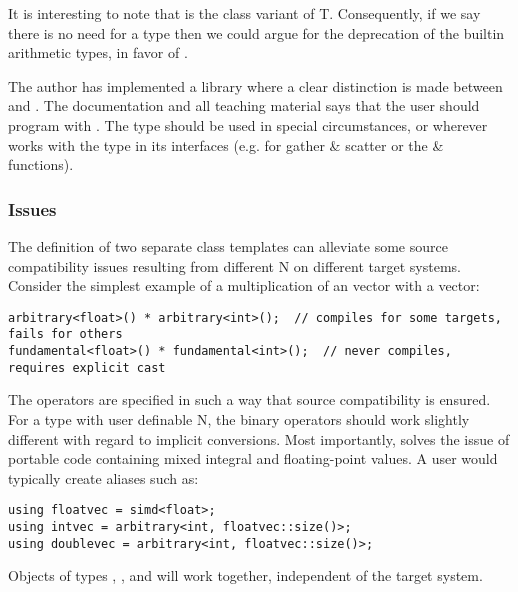 It is interesting to note that  is the class variant of \type T.
Consequently, if we say there is no need for a  type then we could argue for the deprecation of the builtin arithmetic types, in favor of . 

The author has implemented a library where a clear distinction is made between  and .
The documentation and all teaching material says that the user should program with .
The  type should be used in special circumstances, or wherever  works with the  type in its interfaces (e.g. for gather \& scatter or the  \&  functions).

\subsubsection{Issues}
The definition of two separate class templates can alleviate some source compatibility issues resulting from different \code N on different target systems.
Consider the simplest example of a multiplication of an \intt vector with a \float vector:
\smallskip\begin{lstlisting}[style=Vc]
arbitrary<float>() * arbitrary<int>();  // compiles for some targets, fails for others
fundamental<float>() * fundamental<int>();  // never compiles, requires explicit cast
\end{lstlisting}
The \simd[<T>] operators are specified in such a way that source compatibility is ensured.
For a type with user definable \code N, the binary operators should work slightly different with regard to implicit conversions.
Most importantly,  solves the issue of portable code containing mixed integral and floating-point values.
A user would typically create aliases such as:
\smallskip\begin{lstlisting}[style=Vc]
using floatvec = simd<float>;
using intvec = arbitrary<int, floatvec::size()>;
using doublevec = arbitrary<int, floatvec::size()>;
\end{lstlisting}
Objects of types , , and  will work together, independent of the target system.

